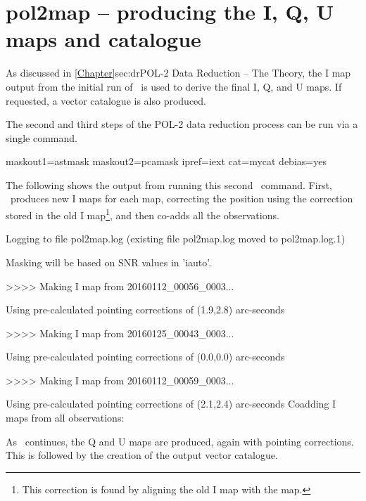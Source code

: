 \section{pol2map -- producing the I, Q, U maps and catalogue}
\label{sec:how-step23}

As discussed in \cref{Chapter}{sec:dr}{POL-2 Data Reduction -- The
  Theory}, the I map output from the initial run of \poltwomap\ is used to
derive the final I, Q, and U maps. If requested, a vector catalogue is
also produced.

The second and third steps of the POL-2 data reduction process can be
run via a single command.

\begin{terminalv}
          maskout1=astmask maskout2=pcamask ipref=iext cat=mycat debias=yes
\end{terminalv}

The following shows the output from running this second \poltwomap\
command. First, \poltwomap\ produces new I maps for each map, correcting
the position using the correction stored in the old I
map\footnote{This correction is found by aligning the old I map with the
\file{iauto.sdf} map.}, and then co-adds all the observations.

\begin{terminalv}
Logging to file pol2map.log
(existing file pol2map.log moved to pol2map.log.1)

Masking will be based on SNR values in 'iauto'.

>>>>   Making I map from 20160112_00056_0003...

   Using pre-calculated pointing corrections of (1.9,2.8) arc-seconds

>>>>   Making I map from 20160125_00043_0003...

   Using pre-calculated pointing corrections of (0.0,0.0) arc-seconds

>>>>   Making I map from 20160112_00059_0003...

   Using pre-calculated pointing corrections of (2.1,2.4) arc-seconds
Coadding I maps from all observations:
\end{terminalv}

As \poltwomap\ continues, the Q and U maps are produced, again with
pointing corrections. This is followed by the creation of the output
vector catalogue.

